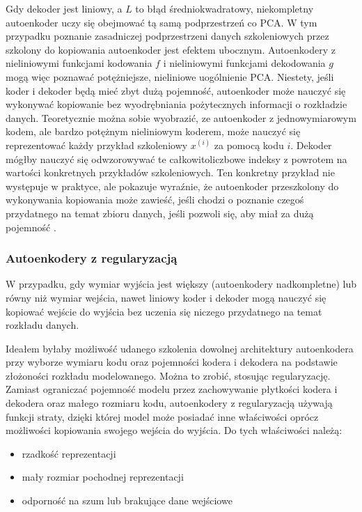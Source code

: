 \documentclass[12pt]{mwbk}
\theoremstyle{plain}
\theoremstyle{definition}
\theoremstyle{remark}
\begin{document}
Gdy dekoder jest liniowy, a $L$ to błąd średniokwadratowy, niekompletny autoenkoder uczy się obejmować tą samą podprzestrzeń co PCA. W tym przypadku poznanie zasadniczej podprzestrzeni danych szkoleniowych przez szkolony do kopiowania autoenkoder jest efektem ubocznym. Autoenkodery z nieliniowymi funkcjami kodowania $f$ i nieliniowymi funkcjami dekodowania $g$ mogą więc poznawać potężniejsze, nieliniowe uogólnienie PCA. Niestety, jeśli koder i dekoder będą mieć zbyt dużą pojemność, autoenkoder może nauczyć się wykonywać kopiowanie bez wyodrębniania pożytecznych informacji o rozkładzie danych. Teoretycznie można sobie wyobrazić, ze autoenkoder z jednowymiarowym kodem, ale bardzo potężnym nieliniowym koderem, może nauczyć się reprezentować każdy przykład szkoleniowy $x^{(i)}$ za pomocą kodu $i$. Dekoder mógłby nauczyć się odwzorowywać te całkowitoliczbowe indeksy z powrotem na wartości konkretnych przykładów szkoleniowych. Ten konkretny przykład nie występuje w praktyce, ale pokazuje wyraźnie, że autoenkoder przeszkolony do wykonywania kopiowania może zawieść, jeśli chodzi o poznanie czegoś przydatnego na temat zbioru danych, jeśli pozwoli się, aby miał za dużą pojemność \cite{goodfellow}.

\subsubsection{Autoenkodery z regularyzacją}



W przypadku, gdy wymiar wyjścia jest większy (autoenkodery nadkompletne) lub równy niż wymiar wejścia, nawet liniowy koder i dekoder mogą nauczyć się kopiować wejście do wyjścia bez uczenia się niczego przydatnego na temat rozkładu danych.

Ideałem byłaby możliwość udanego szkolenia dowolnej architektury autoenkodera przy wyborze wymiaru kodu oraz pojemności kodera i dekodera na podstawie złożoności rozkładu modelowanego. Można to zrobić, stosując regularyzację. Zamiast ograniczać pojemność modelu przez zachowywanie płytkości kodera i dekodera oraz małego rozmiaru kodu, autoenkodery z regularyzacją używają funkcji straty, dzięki której model może posiadać inne właściwości oprócz możliwości kopiowania swojego wejścia do wyjścia. Do tych właściwości należą:

\begin{itemize}
	\item  rzadkość reprezentacji
	\item mały rozmiar pochodnej reprezentacji
	\item odporność na szum lub brakujące dane wejściowe
\end{itemize}
\end{document}
